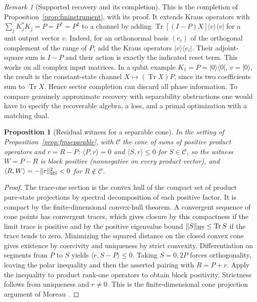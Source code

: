 \documentclass[aps,pra,onecolumn,superscriptaddress,nofootinbib,10pt]{revtex4-2}
\newtheorem{proposition}[theorem]{Proposition}
\theoremstyle{definition}
\theoremstyle{remark}
\newtheorem{remark}[theorem]{Remark}
\newcommand{\tr}{\operatorname{Tr}}
\begin{document}
\begin{remark}[Supported recovery and its completion]\label{ob:completionrecovery}
This is the completion of Proposition~\ref{prop:fminstrument}, with its proof.  It
extends Kraus operators with
\(\sum_jK_j^*K_j=P=P^*=P^2\) to a channel by adding
\(\tr[(I-P)X]|v\rangle\langle v|\) for a unit output vector \(v\).
Indeed, for an orthonormal basis $(e_i)$ of the orthogonal
complement of the range of $P$, add the Kraus operators
$|v\rangle\langle e_i|$. Their adjoint-square sum is $I-P$
and their action is exactly the indicated reset term.
This works on all complex input matrices. In a qubit example
\(K_1=P=|0\rangle\langle0|\), \(v=|0\rangle\), the result is the
constant-state channel \(X\mapsto(\tr X)P\), since its two coefficients
sum to \(\tr X\). Hence sector completion can discard all phase
information. To compare genuinely approximate recovery with separability
obstructions one would have to specify the recoverable algebra, a loss,
and a primal optimization with a matching dual.
\end{remark}

\begin{proposition}[Residual witness for a separable cone]\label{ob:separableresidual}
In the setting of Proposition~\ref{prop:fmseparable}, with \(\mathcal C\) the cone of sums of positive product operators and
\(r=R-P\): \(\langle P,r\rangle=0\) and \(\langle S,r\rangle\le0\) for \(S\in\mathcal C\), so the witness \(W=P-R\) is block positive (nonnegative
on every product vector), and \(\langle R,W\rangle=-\|r\|_{\rm HS}^2<0\) for \(R\notin\mathcal C\).
\end{proposition}
\begin{proof}
The trace-one section is the convex hull of the compact set of
product pure-state projections by spectral decomposition of each
positive factor. It is compact by the finite-dimensional convex-hull
theorem. A convergent sequence of cone points has convergent traces,
which gives closure by this compactness if the limit trace is
positive and by the positive eigenvalue bound
\(\|S\|_{\rm HS}\le\tr S\) if the trace tends to zero.
Minimizing the squared distance on the closed convex cone gives
existence by coercivity and uniqueness by strict convexity.
Differentiation on segments from \(P\) to \(S\) yields
\(\langle r,S-P\rangle\le0\). Taking \(S=0,2P\) forces
orthogonality, leaving the polar inequality and then the asserted
pairing with \(R=P+r\). Apply the inequality to product rank-one
operators to obtain block positivity. Strictness follows from
uniqueness and \(r\ne0\). This is the finite-dimensional cone
projection argument of Moreau \cite{obr:moreau}.
\end{proof}
\end{document}
